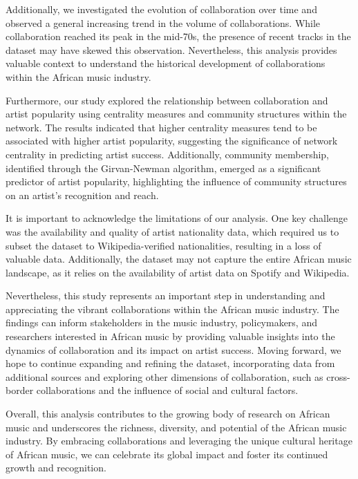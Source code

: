 \documentclass{article}
\begin{document}
Additionally, we investigated the evolution of collaboration over time and
observed a general increasing trend in the volume of collaborations. While
collaboration reached its peak in the mid-70s, the presence of recent tracks in
the dataset may have skewed this observation. Nevertheless, this analysis
provides valuable context to understand the historical development of
collaborations within the African music industry.

Furthermore, our study explored the relationship between collaboration and
artist popularity using centrality measures and community structures within the
network. The results indicated that higher centrality measures tend to be
associated with higher artist popularity, suggesting the significance of
network centrality in predicting artist success. Additionally, community
membership, identified through the Girvan-Newman algorithm, emerged as a
significant predictor of artist popularity, highlighting the influence of
community structures on an artist's recognition and reach.

It is important to acknowledge the limitations of our analysis. One key
challenge was the availability and quality of artist nationality data, which
required us to subset the dataset to Wikipedia-verified nationalities,
resulting in a loss of valuable data. Additionally, the dataset may not capture
the entire African music landscape, as it relies on the availability of artist
data on Spotify and Wikipedia.

Nevertheless, this study represents an important step in understanding and
appreciating the vibrant collaborations within the African music industry. The
findings can inform stakeholders in the music industry, policymakers, and
researchers interested in African music by providing valuable insights into the
dynamics of collaboration and its impact on artist success. Moving forward, we
hope to continue expanding and refining the dataset, incorporating data from
additional sources and exploring other dimensions of collaboration, such as
cross-border collaborations and the influence of social and cultural factors.

Overall, this analysis contributes to the growing body of research on African
music and underscores the richness, diversity, and potential of the African
music industry. By embracing collaborations and leveraging the unique cultural
heritage of African music, we can celebrate its global impact and foster its
continued growth and recognition.
\end{document}
